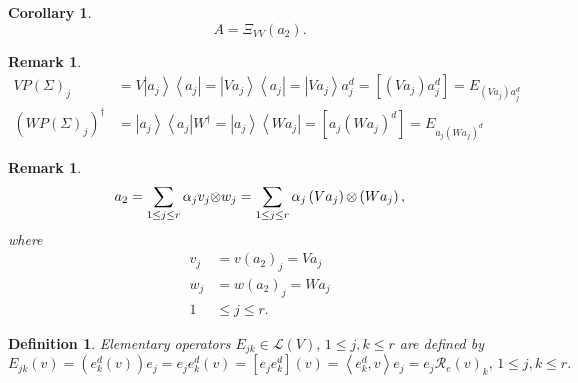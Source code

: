 \documentclass[aps,preprint]{revtex4}%
\newtheorem{corollary}[theorem]{Corollary}
\newtheorem{definition}[theorem]{Definition}
\newtheorem{remark}[theorem]{Remark}
\begin{document}
\begin{corollary}%
\begin{equation}
A=\Xi_{VV}\left(  a_{2}\right)  .
\end{equation}

\end{corollary}

\begin{remark}%
\begin{align}
VP\left(  \Sigma\right)  _{j}  &  =V\left\vert a_{j}\right\rangle \left\langle
a_{j}\right\vert =\left\vert Va_{j}\right\rangle \left\langle a_{j}\right\vert
=\left\vert Va_{j}\right\rangle a_{j}^{d}=\left[  \left(  Va_{j}\right)
a_{j}^{d}\right]  =E_{\left(  Va_{j}\right)  a_{j}^{d}}\\
\left(  WP\left(  \Sigma\right)  _{j}\right)  ^{\dagger}  &  =\left\vert
a_{j}\right\rangle \left\langle a_{j}\right\vert W^{\dagger}=\left\vert
a_{j}\right\rangle \left\langle Wa_{j}\right\vert =\left[  a_{j}\left(
Wa_{j}\right)  ^{d}\right]  =E_{a_{j}\left(  Wa_{j}\right)  ^{d}}%
\end{align}

\end{remark}

\begin{remark}%
\begin{equation}
a_{2}=\sum_{1\leq j\leq r}\alpha_{j}v_{j}{\small \otimes}w_{j}=\sum_{1\leq
j\leq r}\alpha_{j}\left(  Va_{j}\right)  {\small \otimes}\left(
Wa_{j}\right)  ,
\end{equation}
where
\begin{align}
v_{j}  &  =v\left(  a_{2}\right)  _{j}=Va_{j}\\
w_{j}  &  =w\left(  a_{2}\right)  _{j}=Wa_{j}\\
1  &  \leq j\leq r.
\end{align}

\end{remark}

\begin{definition}
Elementary operators $E_{jk}\in\mathcal{L}\left(  V\right)  ,\,1\leq j,k\leq
r$ are defined by
\begin{equation}
E_{jk}\left(  v\right)  =\left(  e_{k}^{d}\left(  v\right)  \right)
e_{j}=e_{j}e_{k}^{d}\left(  v\right)  =\left[  e_{j}e_{k}^{d}\right]  \left(
v\right)  =\left\langle e_{k}^{d},v\right\rangle e_{j}=e_{j}\mathcal{R}%
_{e}\left(  v\right)  _{k},\,1\leq j,k\leq r.
\end{equation}

\end{definition}
\end{document}
